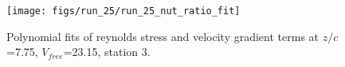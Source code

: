 \begin{figure}[H]
\centering
\texttt{[image: figs/run\_25/run\_25\_nut\_ratio\_fit]}
\caption{Polynomial fits of reynolds stress and velocity gradient terms at $z/c$=7.75, $V_{free}$=23.15, station 3.}
\label{fig:run_25_nut_ratio_fit}
\end{figure}


